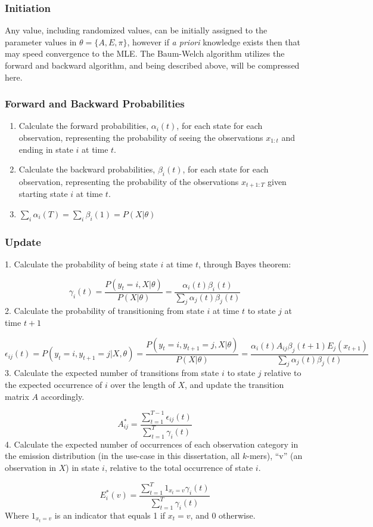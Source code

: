 \subsubsection{Initiation}
Any value, including randomized values, can be initially assigned to the parameter values in $\theta = \{A,E,\pi\}$, however if \textit{a priori} knowledge exists then that may speed convergence to the MLE. The Baum-Welch algorithm utilizes the forward and backward algorithm, and being described above, will be compressed here.

\subsubsection{Forward and Backward Probabilities }
\begin{enumerate}
\item Calculate the forward probabilities, $\alpha_i(t)$, for each state for each observation, representing the probability of seeing the observations $x_{1:t}$ and ending in state $i$ at time $t$. 
\item Calculate the backward probabilities, $\beta_i(t)$, for each state for each observation, representing the probability of the observations $x_{t+1:T}$ given starting state $i$ at time $t$. 
\item $\sum_i{\alpha_i(T)} = \sum_i{\beta_i(1)} = P(X|\theta)$       
\end{enumerate}

\subsubsection{Update}

1. Calculate the probability of being state $i$ at time $t$, through Bayes theorem: 

$$\gamma_i(t) = \frac{P(y_t = i,X|\theta)}{P(X|\theta)}= \frac{\alpha_i(t)\beta_i(t)}{\sum_j{\alpha_j(t)\beta_j(t)}}$$
2. Calculate the probability of transitioning from state $i$ at time $t$ to state $j$ at time $t+1$ 

$$\epsilon_{ij}(t) = P(y_t =i,y_{t+1}=j|X,\theta) = \frac{P(y_t = i,y_{t+1}=j,X|\theta)}{P(X|\theta)} = \frac{\alpha_i(t)A_{ij}\beta_j(t+1)E_j(x_{t+1})}{\sum_j{\alpha_j(t)\beta_j(t)}}$$ 
3. Calculate the expected number of transitions from state $i$ to state $j$ relative to the expected occurrence of $i$ over the length of $X$, and update the transition matrix $A$ accordingly. 

$$A_{ij}^* = \frac{\sum_{t=1}^{T-1}{\epsilon_{ij}(t)}}{\sum_{t=1}^{T}{\gamma_i(t)}}$$ 4. Calculate the expected number of occurrences of each observation category in the emission distribution (in the use-case in this dissertation, all $k$-mers), ``v'' (an observation in $X$) in state $i$, relative to the total occurrence of state $i$. 

$$E_i^*(v) = \frac{\sum_{t=1}^T{1_{x_t=v}}\gamma_i(t)}{\sum_{t=1}^T{\gamma_i(t)}}$$ Where $1_{x_t=v}$ is an indicator that equals 1 if $x_t = v$, and 0 otherwise. 



\subsubsection{}


\begin{singlespace}
\printbibliography[heading=bibintoc,title={References}]
\end{singlespace}